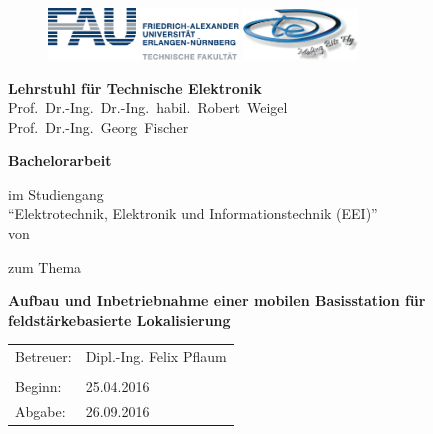 \begin{titlepage}
\begin{figure}
\includegraphics[width=0.45\textwidth]{Abbildungen/Logo/FAUlogo}\hfill
\includegraphics[width=0.27\textwidth]{Abbildungen/Logo/LTElogo}
\end{figure}
\hspace{0.1cm}	
\center
\LARGE
	\textbf{Lehrstuhl für Technische Elektronik} \\
	Prof.~Dr.-Ing.~Dr.-Ing.~habil.~Robert~Weigel	\\
	Prof.~Dr.-Ing.~Georg~Fischer\\
\vspace{1cm}	

\LARGE
	\textbf{Bachelorarbeit}
\vspace{0.9cm}

\large
im Studiengang\\ \enquote{Elektrotechnik, Elektronik und Informationstechnik (EEI)}\\
\vspace{0.5cm}
von
\vspace{0.5cm}

\LARGE{
\authorname}
\vspace{0.7cm}

\large
zum Thema
\vspace{0.9cm}

\LARGE
\textbf{Aufbau und Inbetriebnahme einer mobilen Basisstation für 
feldstärkebasierte Lokalisierung}
\vspace{1.7cm}

\large
\begin{tabular}{ll}
Betreuer: & Dipl.-Ing. Felix Pflaum \\
 &\\
Beginn: & 25.04.2016\\
Abgabe: & 26.09.2016\\
\end{tabular}
\end{titlepage}